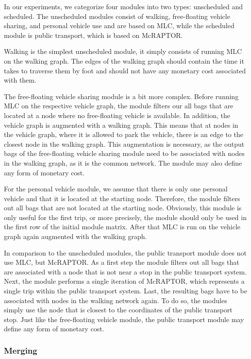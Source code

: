 In our experiments, we categorize four modules into two types: unscheduled and scheduled. 
The unscheduled modules consist of walking, free-floating vehicle sharing, and personal vehicle use and are based on MLC, while the scheduled module is public transport, which is based on McRAPTOR.

Walking is the simplest unscheduled module, it simply consists of running MLC on the walking graph.
The edges of the walking graph should contain the time it takes to traverse them by foot and should not have any monetary cost associated with them.

The free-floating vehicle sharing module is a bit more complex.
Before running MLC on the respective vehicle graph, the module filters our all bags that are located at a node where no free-floating vehicle is available.
In addition, the vehicle graph is augmented with a walking graph. 
This means that at nodes in the vehicle graph, where it is allowed to park the vehicle, there is an edge to the closest node in the walking graph.
This augmentation is necessary, as the output bags of the free-floating vehicle sharing module need to be associated with nodes in the walking graph, as it is the common network.
The module may also define any form of monetary cost.

For the personal vehicle module, we assume that there is only one personal vehicle and that it is located at the starting node.
Therefore, the module filters out all bags that are not located at the starting node.
Obviously, this module is only useful for the first trip, or more precisely, the module should only be used in the first row of the initial module matrix.
After that MLC is run on the vehicle graph again augmented with the walking graph.

In comparison to the unscheduled modules, the public transport module does not use MLC, but McRAPTOR.
As a first step the module filters out all bags that are associated with a node that is not near a stop in the public transport system.
Next, the module performs a single iteration of McRAPTOR, which represents a single trip within the public transport system.
Last, the resulting bags have to be associated with nodes in the walking network again.
To do so, the modules simply use the node that is closest to the coordinates of the public transport stop.
Just like the free-floating vehicle module, the public transport module may define any form of monetary cost.

\subsubsection{Merging}
\label{subsubsec:merging}

